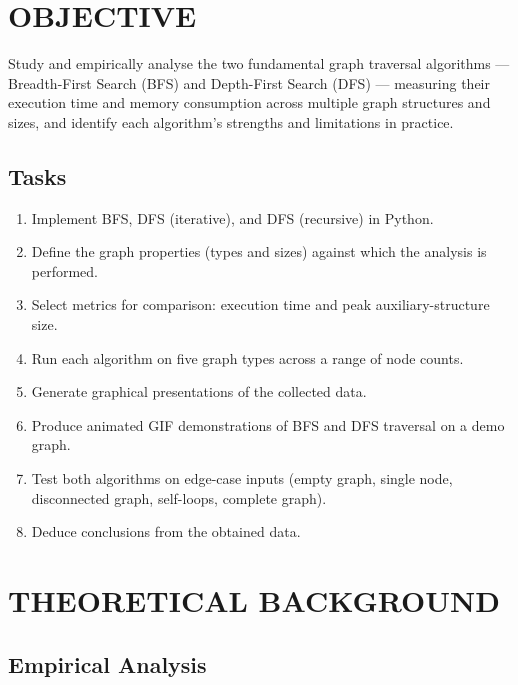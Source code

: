 \documentclass[12pt]{article}
\begin{document}
\clearpage
\setcounter{page}{2}
\pagestyle{fancy}
\fancyhf{}
\rhead{\thepage}

\section*{OBJECTIVE}

Study and empirically analyse the two fundamental graph traversal algorithms ---
Breadth-First Search (BFS) and Depth-First Search (DFS) --- measuring their execution
time and memory consumption across multiple graph structures and sizes, and identify
each algorithm's strengths and limitations in practice.

\subsection*{Tasks}

\begin{enumerate}
  \item Implement BFS, DFS (iterative), and DFS (recursive) in Python.
  \item Define the graph properties (types and sizes) against which the analysis is performed.
  \item Select metrics for comparison: execution time and peak auxiliary-structure size.
  \item Run each algorithm on five graph types across a range of node counts.
  \item Generate graphical presentations of the collected data.
  \item Produce animated GIF demonstrations of BFS and DFS traversal on a demo graph.
  \item Test both algorithms on edge-case inputs (empty graph, single node, disconnected
        graph, self-loops, complete graph).
  \item Deduce conclusions from the obtained data.
\end{enumerate}

\section*{THEORETICAL BACKGROUND}

\subsection*{Empirical Analysis}
\end{document}
